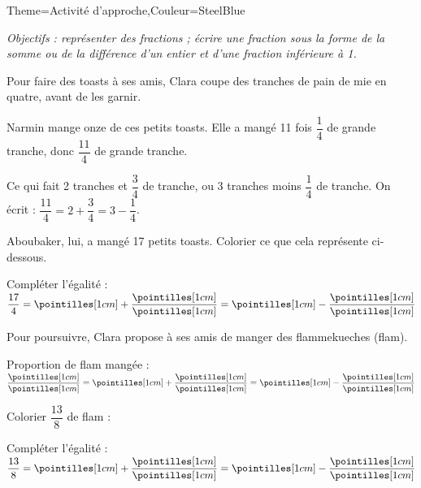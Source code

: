 \begin{Maquette}[Cours]{Theme={Activité d'approche},Couleur={SteelBlue}}


   {\it Objectifs : représenter des fractions ; écrire une fraction sous la forme de la somme ou de la différence d'un entier et d'une fraction inférieure à 1.}

      \begin{AActivite}

            Pour faire des toasts à ses amis, Clara coupe des tranches de pain de mie en quatre, avant de les garnir. \par
            Narmin mange onze de ces petits toasts. Elle a mangé 11 fois $\dfrac14$ de grande tranche, donc $\dfrac{11}4$ de grande tranche.
            \begin{center}
               \qquad
            \end{center}
            Ce qui fait 2 tranches et $\dfrac34$ de tranche, ou 3 tranches moins $\dfrac14$ de tranche. On écrit : $\dfrac{11}{4} =2+\dfrac34 =3-\dfrac14$. \par \smallskip
            Aboubaker, lui, a mangé 17 petits toasts. Colorier ce que cela représente ci-dessous.
            \begin{center}
            \end{center}
            \smallskip
            Compléter l'égalité  : \quad $\dfrac{17}{4} = \pointilles[1cm] + \dfrac{\pointilles[1cm]}{\pointilles[1cm]} =\pointilles[1cm] - \dfrac{\pointilles[1cm]}{\pointilles[1cm]}$

         Pour poursuivre, Clara propose à ses amis de manger des flammekueches (flam). \par
         \begin{center}
             \qquad {}
         \end{center}
         Proportion de flam mangée : $\dfrac{\pointilles[1cm]}{\pointilles[1cm]} ={\pointilles[1cm]} + \dfrac{\pointilles[1cm]}{\pointilles[1cm]} ={\pointilles[1cm]} - \dfrac{\pointilles[1cm]}{\pointilles[1cm]}$ \par \bigskip
         Colorier $\dfrac{13}{8}$ de flam : \qquad {} \par \bigskip
         Compléter l'égalité  : \quad $\dfrac{13}{8} ={\pointilles[1cm]} + \dfrac{\pointilles[1cm]}{\pointilles[1cm]} ={\pointilles[1cm]} - \dfrac{\pointilles[1cm]}{\pointilles[1cm]}$ \par \bigskip


\end{AActivite}
\end{Maquette}
